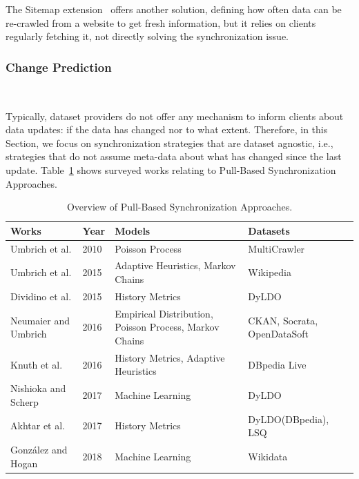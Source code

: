 \documentclass[sw]{iosart2x}
\begin{document}
The Sitemap extension~\cite{CyganiakSDDT08} offers another solution, defining how often data can be re-crawled from a website to get fresh information, but it relies on clients regularly fetching it, not directly solving the synchronization issue. 

\subsubsection{Change Prediction}\label{Prediction}
~\cite{UmbrichHHPD10,BarsottiDD17a,GonzalezH18}

Typically, dataset providers do not offer any mechanism to inform clients about data updates: if the data has changed nor to what extent. Therefore, in this Section, we focus on synchronization strategies that are dataset agnostic, i.e., strategies that do not assume meta-data about what has changed since the last update. Table~\ref{tab:pull} shows surveyed works relating to Pull-Based Synchronization Approaches.\\

\begin{table}[h]
	\centering
	\caption{Overview of Pull-Based Synchronization Approaches.}
	\label{tab:pull}
	\begin{tabular}{llll} \hline
		Works                                            & Year & Models                          & Datasets          \\ \hline
		Umbrich et al. \cite{UmbrichHHPD10}                & 2010 & Poisson Process                          & MultiCrawler        \\
		Umbrich et al. \cite{UmbrichMP15}                 & 2015 & Adaptive Heuristics, Markov Chains           & Wikipedia          \\
		Dividino et al. \cite{DividinoGS15}                & 2015 & History Metrics     & DyLDO            \\
		Neumaier and Umbrich \cite{NeumaierU16}         & 2016 & Empirical Distribution, Poisson Process, Markov Chains              & CKAN, Socrata, OpenDataSoft \\
		Knuth et al. \cite{KnuthHS16}                   & 2016 & History Metrics, Adaptive Heuristics & DBpedia Live         \\
		Nishioka and Scherp \cite{NishiokaS17}          & 2017 & Machine Learning     & DyLDO            \\
		Akhtar et al. \cite{AkhtarAL17}                  & 2017 & History Metrics                  & DyLDO(DBpedia), LSQ     \\
		Gonz\'{a}lez and Hogan \cite{GonzalezH18}         & 2018 & Machine Learning                         & Wikidata  \\  \hline      
	\end{tabular}
\end{table}
\end{document}
